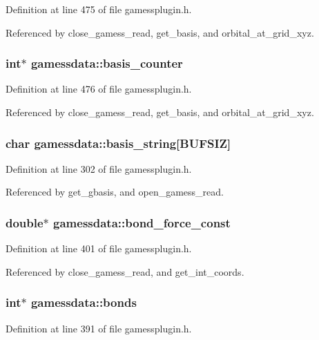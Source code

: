 Definition at line 475 of file gamessplugin.h.

Referenced by close\_\-gamess\_\-read, get\_\-basis, and orbital\_\-at\_\-grid\_\-xyz.
\subsubsection{\setlength{\rightskip}{0pt plus 5cm}int$\ast$ gamessdata::basis\_\-counter}\label{structgamessdata_m62}




Definition at line 476 of file gamessplugin.h.

Referenced by close\_\-gamess\_\-read, get\_\-basis, and orbital\_\-at\_\-grid\_\-xyz.
\subsubsection{\setlength{\rightskip}{0pt plus 5cm}char gamessdata::basis\_\-string[BUFSIZ]}\label{structgamessdata_m5}




Definition at line 302 of file gamessplugin.h.

Referenced by get\_\-gbasis, and open\_\-gamess\_\-read.
\subsubsection{\setlength{\rightskip}{0pt plus 5cm}double$\ast$ gamessdata::bond\_\-force\_\-const}\label{structgamessdata_m49}




Definition at line 401 of file gamessplugin.h.

Referenced by close\_\-gamess\_\-read, and get\_\-int\_\-coords.
\subsubsection{\setlength{\rightskip}{0pt plus 5cm}int$\ast$ gamessdata::bonds}\label{structgamessdata_m44}




Definition at line 391 of file gamessplugin.h.

